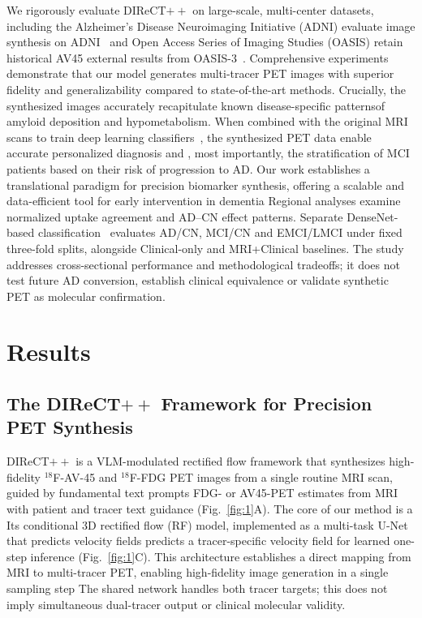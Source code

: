 \documentclass{article}
\providecommand{\DIFaddtex}[1]{{\protect\color{blue} \sf #1}} %
\providecommand{\DIFdeltex}[1]{{\protect\color{red} \scriptsize #1}} %
\providecommand{\DIFaddbegin}{} %
\providecommand{\DIFaddend}{} %
\providecommand{\DIFdelbegin}{} %
\providecommand{\DIFdelend}{} %
\providecommand{\DIFadd}[1]{\texorpdfstring{\DIFaddtex{#1}}{#1}} %
\providecommand{\DIFdel}[1]{\texorpdfstring{\DIFdeltex{#1}}{}} %
\newcommand{\DIFscaledelfig}{0.5}
\newlength{\DIFdelgraphicswidth} %
\newlength{\DIFdelgraphicsheight} %
\newcommand{\DIFaddincludegraphics}[2][]{{\color{blue}\fbox{\DIFOincludegraphics[#1]{#2}}}} %
\newcommand{\DIFdelincludegraphics}[2][]{%
\sbox{\DIFdelgraphicsbox}{\DIFOincludegraphics[#1]{#2}}%
\settoboxwidth{\DIFdelgraphicswidth}{\DIFdelgraphicsbox} %
\settoboxtotalheight{\DIFdelgraphicsheight}{\DIFdelgraphicsbox} %
\scalebox{\DIFscaledelfig}{%
\parbox[b]{\DIFdelgraphicswidth}{\usebox{\DIFdelgraphicsbox}\\[-\baselineskip] \rule{\DIFdelgraphicswidth}{0em}}\llap{\resizebox{\DIFdelgraphicswidth}{\DIFdelgraphicsheight}{%
\setlength{\unitlength}{\DIFdelgraphicswidth}%
\begin{picture}(1,1)%
\thicklines\linethickness{2pt} %
{\color[rgb]{1,0,0}\put(0,0){\framebox(1,1){}}}%
{\color[rgb]{1,0,0}\put(0,0){\line( 1,1){1}}}%
{\color[rgb]{1,0,0}\put(0,1){\line(1,-1){1}}}%
\end{picture}%
}\hspace*{3pt}}} %
} %
\DeclareRobustCommand{\DIFaddbegin}{\DIFOaddbegin \let\includegraphics\DIFaddincludegraphics} %
\DeclareRobustCommand{\DIFaddend}{\DIFOaddend \let\includegraphics\DIFOincludegraphics} %
\DeclareRobustCommand{\DIFdelbegin}{\DIFOdelbegin \let\includegraphics\DIFdelincludegraphics} %
\DeclareRobustCommand{\DIFdelend}{\DIFOaddend \let\includegraphics\DIFOincludegraphics} %
\begin{document}
We \DIFdelbegin \DIFdel{rigorously evaluate DIReCT$++$ on large-scale, multi-center datasets, including the Alzheimer's Disease Neuroimaging Initiative (ADNI)}\DIFdelend \DIFaddbegin \DIFadd{evaluate image synthesis on ADNI}\DIFaddend ~\cite{weiner2010alzheimer} and \DIFdelbegin \DIFdel{Open Access Series of Imaging Studies (OASIS)}\DIFdelend \DIFaddbegin \DIFadd{retain historical AV45 external results from OASIS-3}\DIFaddend ~\cite{lamontagne2019oasis}. \DIFdelbegin \DIFdel{Comprehensive experiments demonstrate that our model generates multi-tracer PET images with superior fidelity and generalizability compared to state-of-the-art methods. Crucially, the synthesized images accurately recapitulate known disease-specific patternsof amyloid deposition and hypometabolism. When combined with the original MRI scans to train deep learning classifiers~\cite{lian2018hierarchical,huang2017densely}, the synthesized PET data enable accurate personalized diagnosis and , most importantly, the stratification of MCI patients based on their risk of progression to AD. Our work establishes a translational paradigm for precision biomarker synthesis, offering a scalable and data-efficient tool for early intervention in dementia}\DIFdelend \DIFaddbegin \DIFadd{Regional analyses examine normalized uptake agreement and AD--CN effect patterns. Separate DenseNet-based classification~\cite{huang2017densely} evaluates AD/CN, MCI/CN and EMCI/LMCI under fixed three-fold splits, alongside Clinical-only and MRI+Clinical baselines. The study addresses cross-sectional performance and methodological tradeoffs; it does not test future AD conversion, establish clinical equivalence or validate synthetic PET as molecular confirmation}\DIFaddend .


\section{Results}
\subsection{The \texorpdfstring{DIReCT$++$}{DIReCT++} Framework for Precision PET Synthesis}
DIReCT$++$ is a VLM-modulated rectified flow framework that synthesizes \DIFdelbegin \DIFdel{high-fidelity $^{18}$F-AV-45 and $^{18}$F-FDG PET images from a single routine MRI scan, guided by fundamental text prompts }\DIFdelend \DIFaddbegin \DIFadd{FDG- or AV45-PET estimates from MRI with patient and tracer text guidance }\DIFaddend (Fig.~\ref{fig:1}A). \DIFdelbegin \DIFdel{The core of our method is a }\DIFdelend \DIFaddbegin \DIFadd{Its }\DIFaddend conditional 3D \DIFdelbegin \DIFdel{rectified flow (RF) model, implemented as a multi-task }\DIFdelend U-Net \DIFdelbegin \DIFdel{that predicts velocity fields }\DIFdelend \DIFaddbegin \DIFadd{predicts a tracer-specific velocity field for learned one-step inference }\DIFaddend (Fig.~\ref{fig:1}C). \DIFdelbegin \DIFdel{This architecture establishes a direct mapping from MRI to multi-tracer PET, enabling high-fidelity image generation in a single sampling step}\DIFdelend \DIFaddbegin \DIFadd{The shared network handles both tracer targets; this does not imply simultaneous dual-tracer output or clinical molecular validity}\DIFaddend .
\end{document}
